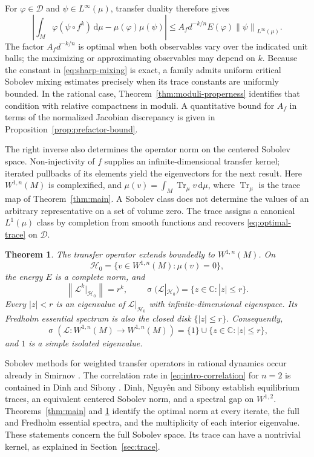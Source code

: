\documentclass[10pt,a4paper]{amsart}
\newtheorem{theorem}{Theorem}[section]
\newcommand{\C}{\mathbb C}
\newcommand{\Lop}{\mathcal L}
\newcommand{\Hcal}{\mathcal H}
\newcommand{\Dcal}{\mathcal D}
\newcommand{\Tr}{\operatorname{Tr}_{\mu}}
\newcommand{\norm}[1]{\left\lVert #1\right\rVert}
\newcommand{\abs}[1]{\left\lvert #1\right\rvert}
\newcommand{\dd}{\mathrm d}
\DeclareMathOperator{\spec}{\sigma}
\numberwithin{equation}{section}
\begin{document}
For $\varphi\in\Dcal$ and $\psi\in L^\infty(\mu)$, transfer duality therefore gives
\begin{equation}\label{eq:intro-correlation}
 \abs{\int_M\varphi(\psi\circ f^k)\,\dd\mu-\mu(\varphi)\mu(\psi)}
 \le A_f d^{-k/n}E(\varphi)\norm{\psi}_{L^\infty(\mu)}.
\end{equation}
The factor $A_f d^{-k/n}$ is optimal when both observables vary over the indicated unit balls; the maximizing or approximating observables may depend on $k$. Because the constant in \eqref{eq:sharp-mixing} is exact, a family admits uniform critical Sobolev mixing estimates precisely when its trace constants are uniformly bounded. In the rational case, Theorem~\ref{thm:moduli-properness} identifies that condition with relative compactness in moduli. A quantitative bound for $A_f$ in terms of the normalized Jacobian discrepancy is given in Proposition~\ref{prop:prefactor-bound}.

The right inverse also determines the operator norm on the centered Sobolev space. Non-injectivity of $f$ supplies an infinite-dimensional transfer kernel; iterated pullbacks of its elements yield the eigenvectors for the next result. Here $W^{1,n}(M)$ is complexified, and $\mu(v)=\int_M\Tr v\,\dd\mu$, where $\Tr$ is the trace map of Theorem~\ref{thm:main}. A Sobolev class does not determine the values of an arbitrary representative on a set of volume zero. The trace assigns a canonical $L^1(\mu)$ class by completion from smooth functions and recovers \eqref{eq:optimal-trace} on $\Dcal$.

\begin{theorem}\label{thm:spectrum-intro}
The transfer operator extends boundedly to $W^{1,n}(M)$. On
\[
 \Hcal_0=\{v\in W^{1,n}(M):\mu(v)=0\},
\]
the energy $E$ is a complete norm, and
\begin{equation}\label{eq:spectrum-intro}
 \norm{\Lop^k|_{\Hcal_0}}=r^k,
 \qquad
 \spec(\Lop|_{\Hcal_0})=\{z\in\C:|z|\le r\}.
\end{equation}
Every $|z|<r$ is an eigenvalue of $\Lop|_{\Hcal_0}$ with infinite-dimensional eigenspace. Its Fredholm essential spectrum is also the closed disk $\{|z|\le r\}$. Consequently,
\[
 \spec(\Lop\colon W^{1,n}(M)\to W^{1,n}(M))
 =\{1\}\cup\{z\in\C:|z|\le r\},
\]
and $1$ is a simple isolated eigenvalue.
\end{theorem}

Sobolev methods for weighted transfer operators in rational dynamics occur already in Smirnov \cite[Chapter 2, Section 3]{Smi96}. The correlation rate in \eqref{eq:intro-correlation} for $n=2$ is contained in Dinh and Sibony \cite[Theorem 6.1]{DS06}. Dinh, Nguy\^en and Sibony \cite[Sections 2 and 3]{DNS07} establish equilibrium traces, an equivalent centered Sobolev norm, and a spectral gap on $W^{1,2}$. Theorems~\ref{thm:main} and \ref{thm:spectrum-intro} identify the optimal norm at every iterate, the full and Fredholm essential spectra, and the multiplicity of each interior eigenvalue. These statements concern the full Sobolev space. Its trace can have a nontrivial kernel, as explained in Section~\ref{sec:trace}.
\end{document}
